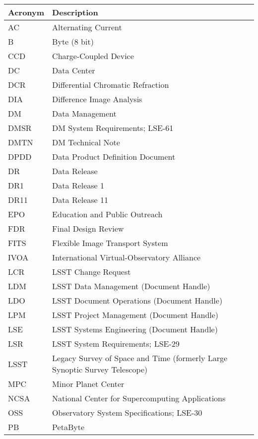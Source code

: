 \addtocounter{table}{-1}
\begin{longtable}{p{}p{}}\hline
\textbf{Acronym} & \textbf{Description}  \\\hline

AC & Alternating Current \\\hline
B & Byte (8 bit) \\\hline
CCD & Charge-Coupled Device \\\hline
DC & Data Center \\\hline
DCR & Differential Chromatic Refraction \\\hline
DIA & Difference Image Analysis \\\hline
DM & Data Management \\\hline
DMSR & DM System Requirements; LSE-61 \\\hline
DMTN & DM Technical Note \\\hline
DPDD & Data Product Definition Document \\\hline
DR & Data Release \\\hline
DR1 & Data Release 1 \\\hline
DR11 & Data Release 11 \\\hline
EPO & Education and Public Outreach \\\hline
FDR & Final Design Review \\\hline
FITS & Flexible Image Transport System \\\hline
IVOA & International Virtual-Observatory Alliance \\\hline
LCR & LSST Change Request \\\hline
LDM & LSST Data Management (Document Handle) \\\hline
LDO & LSST Document Operations (Document Handle) \\\hline
LPM & LSST Project Management (Document Handle) \\\hline
LSE & LSST Systems Engineering (Document Handle) \\\hline
LSR & LSST System Requirements; LSE-29 \\\hline
LSST & Legacy Survey of Space and Time (formerly Large Synoptic Survey Telescope) \\\hline
MPC & Minor Planet Center \\\hline
NCSA & National Center for Supercomputing Applications \\\hline
OSS & Observatory System Specifications; LSE-30 \\\hline
PB & PetaByte \\\hline

\end{longtable}
